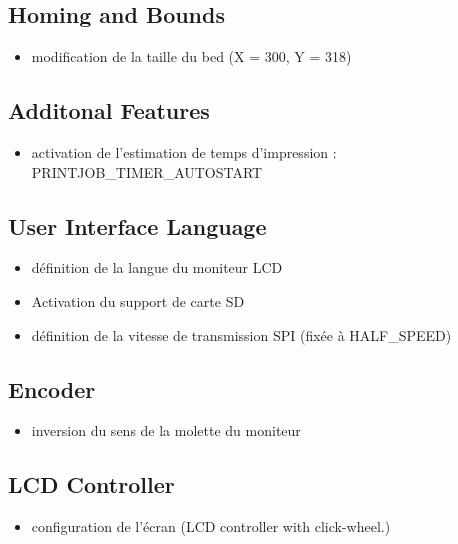 \subsection{Homing and Bounds}
\begin{itemize}
	\item modification de la taille du bed (X = 300, Y = 318)
\end{itemize}

\subsection{Additonal Features}
\begin{itemize}
	\item activation de l'estimation de temps d'impression : PRINTJOB\_TIMER\_AUTOSTART
\end{itemize}

\subsection{User Interface Language}
\begin{itemize}
	\item définition de la langue du moniteur LCD
	\item Activation du support de carte SD
	\item définition de la vitesse de transmission SPI (fixée à HALF\_SPEED)
\end{itemize}

\subsection{Encoder}
\begin{itemize}
	\item inversion du sens de la molette du moniteur
\end{itemize}

\subsection{LCD Controller}
\begin{itemize}
	\item configuration de l'écran (LCD controller with click-wheel.)
\end{itemize}

\newpage
